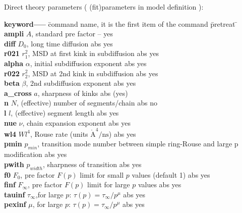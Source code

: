 \documentclass[11pt,fleqn]{book} %
\begin{document}
Direct theory parameters ( (fit)parameters in model definition ):
\begin{tabbing}
\textbf{keyword-----}  \= command name, it is the first item of the command \= pretreat   \=   \kill     
\textbf{ampli    } \>  $A$, standard pre factor                          \>  --        \> yes      \\    
\textbf{diff    } \>  $D_0$, long time diffusion                          \>  abs      \> yes      \\    
\textbf{r021    } \>  $r_1^2$, MSD at first kink in subdiffusion           \>  abs      \> yes      \\    
\textbf{alpha    } \>  $\alpha$, initial subdiffusion exponent           \>  abs      \> yes      \\    
\textbf{r022    } \>  $r_2^2$, MSD at 2nd kink in subdiffusion           \>  abs      \> yes      \\    
\textbf{beta    } \>  $\beta$, 2nd  subdiffusion exponent              \>  abs      \> yes      \\    
\textbf{a\_cross } \>  $a$, sharpness of kinks                        \>  abs      \> (yes)      \\    
\textbf{n }         \>  $N$, (effective) number of segments/chain        \>  abs       \> no       \\              
\textbf{l }         \>  $l$, (effective) segment length                  \>  abs       \> yes       \\             
\textbf{nue }       \>  $\nu$, chain expansion exponent                  \>  abs       \> yes       \\           
\textbf{wl4      } \>  $W l^4$, Rouse rate (units ${\mathrm{\mathring{A}^4/ns}}$) \>  abs       \> yes      \\
\textbf{pmin     } \>  $p_{min}$, transition mode number between simple ring-Rouse and large p modification \>  abs       \> yes      \\
\textbf{pwith     } \>  $p_{width}$, sharpness of transition \>  abs       \> yes      \\
\textbf{f0     } \>  $F_0$,  pre factor $F(p)$ limit for small $p$ values (default 1) \>  abs       \> yes      \\
\textbf{finf     } \>  $F_\infty$,  pre factor $F(p)$ limit for large $p$ values  \>  abs       \> yes      \\
\textbf{tauinf     } \>  $\tau_\infty$,for large $p$: ${\tau(p) = \tau_\infty / p^\mu}$  \>  abs       \> yes      \\
\textbf{pexinf     } \>  $\mu$, for large $p$: ${\tau(p) = \tau_\infty / p^\mu}$  \>  abs       \> yes      \\
\end{tabbing}
\end{document}
